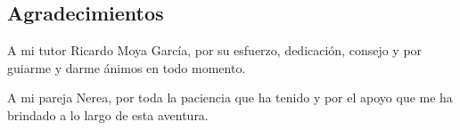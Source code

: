 \begin{flushright}
	\section*{Agradecimientos}
	 A mi tutor Ricardo Moya García, por su esfuerzo, dedicación, consejo y por guiarme y darme ánimos en todo momento.
	 
	 A mi pareja Nerea, por toda la paciencia que ha tenido y por el apoyo que me ha brindado a lo largo de esta aventura.
\end{flushright}
